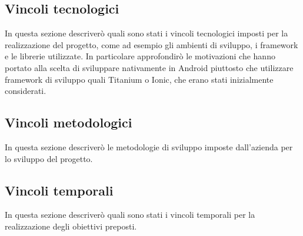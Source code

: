 \subsection{Vincoli tecnologici}

In questa sezione descriverò quali sono stati i vincoli tecnologici imposti per la realizzazione del progetto, come ad esempio gli ambienti di sviluppo, i framework e le librerie utilizzate. In particolare approfondirò le motivazioni che hanno portato alla scelta di sviluppare nativamente in Android piuttosto che utilizzare framework di sviluppo quali Titanium o Ionic, che erano stati inizialmente considerati.

\subsection{Vincoli metodologici}

In questa sezione descriverò le metodologie di sviluppo imposte dall'azienda per lo sviluppo del progetto.

\subsection{Vincoli temporali}

In questa sezione descriverò quali sono stati i vincoli temporali per la realizzazione degli obiettivi preposti.

